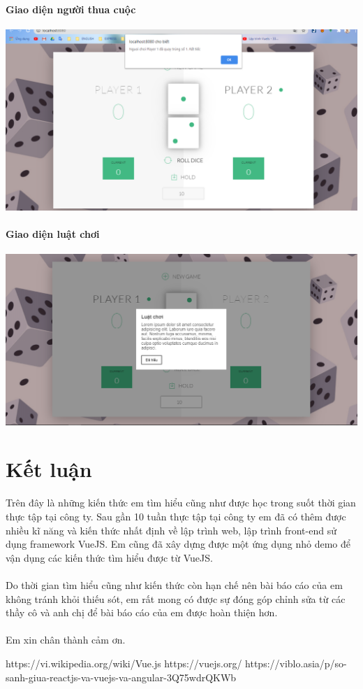 \documentclass[12pt,a4paper]{report}
\begin{document}
\subsubsection{Giao diện người thua cuộc} 
\begin{center}
	\includegraphics[scale=.42]{72}
\end{center}
\subsubsection{Giao diện luật chơi} 
\begin{center}
	\includegraphics[scale=.42]{73}
\end{center}
\chapter{Kết luận}
Trên đây là những kiến thức em tìm hiểu cũng như được học trong suốt thời gian thực
tập tại công ty. Sau gần 10 tuần thực tập tại công ty em đã có thêm được nhiều kĩ năng và kiến
thức nhất định về lập trình web, lập trình front-end sử dụng framework VueJS. Em cũng đã xây dựng được một ứng dụng nhỏ demo để vận dụng các kiến thức tìm hiểu được từ VueJS. \\\\Do thời gian tìm hiểu cũng như kiến thức còn hạn chế nên bài báo cáo
của em không tránh khỏi thiếu sót, em rất mong có được sự đóng góp chỉnh sửa từ
các thầy cô và anh chị để bài báo cáo của em được hoàn thiện hơn.\\\\ Em xin chân thành
cảm ơn.

\begin{thebibliography}{}
	 https://vi.wikipedia.org/wiki/Vue.js
	 https://vuejs.org/
	 https://viblo.asia/p/so-sanh-giua-reactjs-va-vuejs-va-angular-3Q75wdrQKWb
\end{thebibliography}
\end{document}
